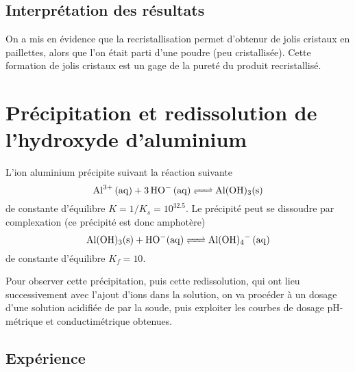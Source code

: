 \documentclass{tp}
\begin{document}
\subsection{Interprétation des résultats}%
\label{sub:interpretation_des_resultats}

On a mis en évidence que la recristallisation permet d'obtenur de jolis cristaux en paillettes, alors que l'on était parti d'une poudre (peu cristallisée). Cette formation de jolis cristaux est un gage de la pureté du produit recristallisé. 

\section{Précipitation et redissolution de l'hydroxyde d'aluminium}%
\label{sec:precipitation_et_redissolution_de_l_hydroxyde_d_aluminium}

L'ion aluminium précipite suivant la réaction suivante 
\begin{equation}
  \ce{Al^3+ (aq) + 3HO- (aq) <=> Al(OH)3(s)} 
\end{equation}
de constante d'équilibre $K=1/K_s=10^{\num{32.5}}$. 
Le précipité peut se dissoudre par complexation (ce précipité est donc amphotère)
\begin{equation}
  \ce{Al(OH)3(s) + HO-(aq) <=> Al(OH)4- (aq)}
\end{equation}
de constante d'équilibre $K_f = \num{10}$. 

Pour observer cette précipitation, puis cette redissolution, qui ont lieu successivement avec l'ajout d'ions  dans la solution, on va procéder à un dosage d'une solution acidifiée de  par la soude, puis exploiter les courbes de dosage pH-métrique et conductimétrique obtenues.

\subsection{Expérience}%
\label{sub:experience}
\end{document}
